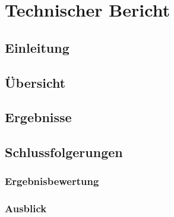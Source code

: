 \section{Technischer Bericht}

\subsection{Einleitung}
\subsection{Übersicht}




\subsection{Ergebnisse}

\subsection{Schlussfolgerungen}
\subsubsection{Ergebnisbewertung}
\subsubsection{Ausblick}